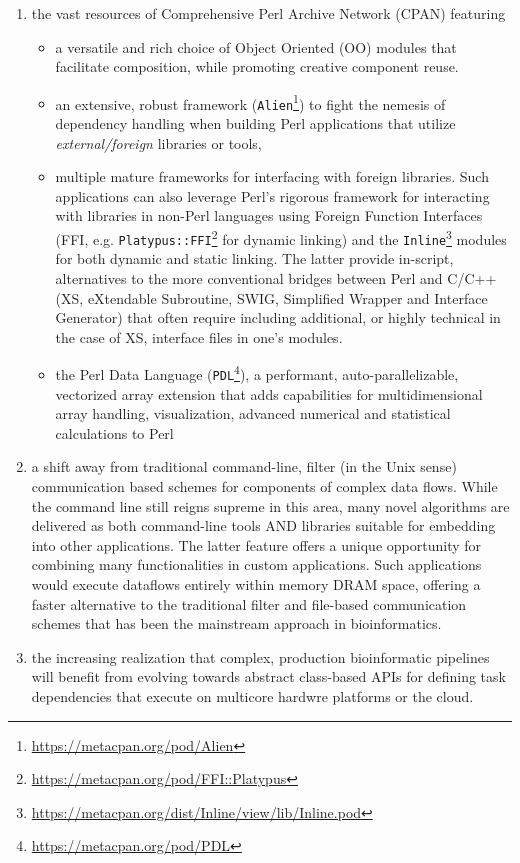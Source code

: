 \documentclass[10pt]{article}
\begin{document}
\begin{enumerate}
    \item the vast resources of Comprehensive Perl Archive Network (CPAN) featuring  
    \begin{itemize}
    \item a versatile and rich choice of Object Oriented (OO) modules that facilitate composition, while promoting creative component reuse.  
    \item an extensive, robust framework (\texttt{Alien}\footnote{\url{https://metacpan.org/pod/Alien}}) to fight the nemesis of dependency handling when building Perl applications that utilize \textit{external/foreign} libraries or tools, 
    \item multiple mature frameworks for interfacing with foreign libraries. Such applications can also leverage Perl’s rigorous framework for interacting with libraries in non-Perl languages using Foreign Function Interfaces (FFI, e.g. \texttt{Platypus::FFI}\footnote{\url{https://metacpan.org/pod/FFI::Platypus}}  for dynamic linking) and the \texttt{Inline}\footnote{\url{https://metacpan.org/dist/Inline/view/lib/Inline.pod}} modules for both dynamic and static linking. The latter provide  in-script, alternatives to the more conventional bridges\cite{jenness_extending_2002} between Perl and C/C++ (XS, eXtendable Subroutine, SWIG, Simplified Wrapper and Interface Generator) that often require including additional, or highly technical in the case of XS,  interface files in one's modules. 
    \item the Perl Data Language (\texttt{PDL}\footnote{\url{https://metacpan.org/pod/PDL}}), a performant, auto-parallelizable, vectorized array extension that adds capabilities for multidimensional array handling, visualization, advanced numerical and statistical calculations to Perl\cite{glazebrook_pdl_1997}
\end{itemize}
    \item a shift away from traditional command-line, filter (in the Unix sense) communication based schemes for components of complex data flows. While the command line still reigns supreme in this area\cite{camacho_blast_2009,li_minimap2_2018,langmead_fast_2012}, many novel algorithms \cite{reinert_seqan_2017, daily_parasail_2016, sosic_edlib_2017} are delivered as both command-line tools AND libraries suitable for embedding into other applications. The latter feature offers a unique opportunity for combining many functionalities in custom applications. Such applications would execute dataflows entirely within memory DRAM space, offering a faster alternative to the traditional filter and file-based communication schemes that has been the mainstream approach in bioinformatics\cite{leipzig_review_2017}. 
    \item the increasing realization that complex,  production bioinformatic pipelines will benefit from evolving towards abstract class-based APIs for defining task dependencies that execute on multicore hardwre platforms or the cloud. 
\end{enumerate}
\end{document}
